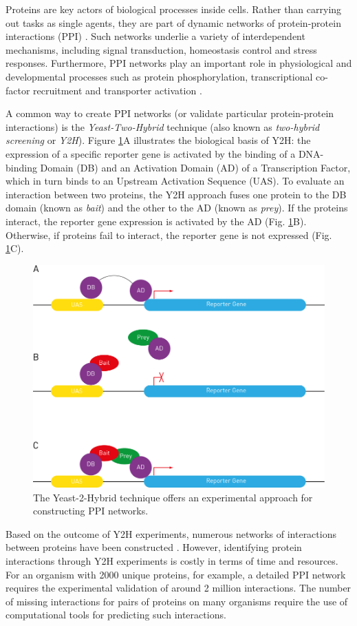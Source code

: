 Proteins are key actors of biological processes inside cells. Rather
than carrying out tasks as single agents, they are part of dynamic
networks of protein-protein interactions (PPI) \cite{Lin2017}. Such
networks underlie a variety of interdependent mechanisms, including
signal transduction, homeostasis control and stress responses. Furthermore,
PPI networks play an important role in physiological and developmental
processes such as protein phosphorylation, transcriptional co-factor
recruitment and transporter activation \cite{Zhang2010PPI}.

A common way to create PPI networks (or validate particular protein-protein
interactions) is the \emph{Yeast-Two-Hybrid} technique (also known
as \emph{two-hybrid screening} or \emph{Y2H}). Figure \ref{Y2H}A
illustrates the biological basis of Y2H: the expression of a specific
reporter gene is activated by the binding of a DNA-binding Domain
(DB) and an Activation Domain (AD) of a Transcription Factor, which
in turn binds to an Upstream Activation Sequence (UAS). To evaluate
an interaction between two proteins, the Y2H approach fuses one protein
to the DB domain (known as \emph{bait}) and the other to the
AD (known as \emph{prey}). If the proteins interact, the reporter
gene expression is activated by the AD (Fig. \ref{Y2H}B). Otherwise,
if proteins fail to interact, the reporter gene is not expressed (Fig.
\ref{Y2H}C).

\begin{figure}[h]
\caption{\label{Y2H}The Yeast-2-Hybrid technique offers an experimental approach
for constructing PPI networks.}
\centering
	\includegraphics[width=0.7\columnwidth]{../Y2H}
\end{figure}

Based on the outcome of Y2H experiments, numerous networks
of interactions between proteins have been constructed \cite{Weimann2013Y2H,Rajagopala2015Y2H,Shokri2019TFY2H}.
However, identifying protein interactions through Y2H experiments is costly in terms of time
and resources\cite{Laraia2015PPI,Macalino2018PPI}. For an organism with 2000
unique proteins, for example, a detailed PPI network requires the experimental
validation of around 2 million interactions. The number of missing
interactions for pairs of proteins on many organisms require the
use of computational tools for predicting such interactions.

